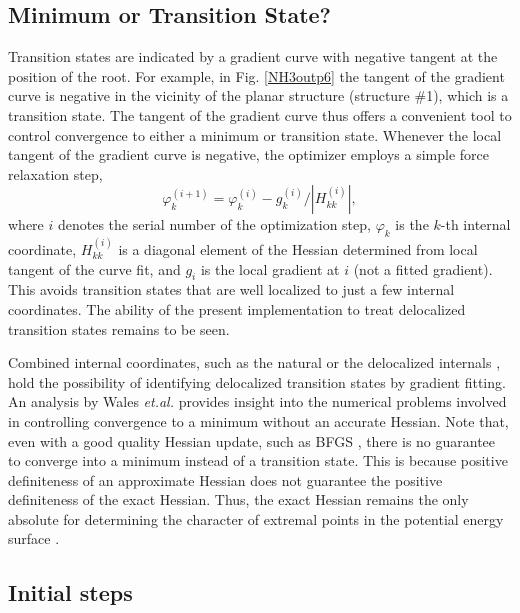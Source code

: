 \documentclass[prl,twocolumn,showpacs,twocolumngrid,superbib]{revtex4}
\begin{document}
\subsection{Minimum or Transition State?}

Transition states are indicated by a gradient curve with  negative tangent at the position
of the root.  For example, in Fig. \ref{NH3outp6} the tangent of the gradient curve is negative 
in the vicinity of the planar structure (structure \#1), which is a transition state. The tangent 
of the gradient curve thus offers a convenient tool to control convergence to either a minimum 
or transition state.  Whenever the local tangent of the gradient curve is negative, the optimizer 
employs a simple force relaxation step,
\begin{equation}
\label{tseq}
\varphi_{k}^{(i+1)} = \varphi_{k}^{(i)} -g_{k}^{(i)}/|H_{kk}^{(i)}| ,
\end{equation}
where $i$ denotes the serial number of the optimization step,  $\varphi_{k}$ is the $k$-th internal coordinate,
 $H^{(i)}_{kk}$ is a diagonal element of the Hessian determined from local tangent of the curve fit, and
$g_i$ is the local gradient at $i$ (not a fitted gradient).
This avoids transition states that are well localized to just a few internal coordinates.
The ability of the present implementation to treat delocalized transition states
remains to be seen. 

Combined internal coordinates, such as the natural \cite{Pulay_natural_internals} or the
delocalized internals \cite{Baker_deloc_1}, hold the possibility of identifying delocalized transition 
states by gradient fitting.  An analysis by  Wales {\it et.al.} \cite{Wales_saddlepoint} provides 
insight into the numerical problems involved in controlling convergence to a minimum without an 
accurate Hessian.  Note that, even with a good quality Hessian update, such as BFGS \cite{RFletcher},
there is no guarantee to converge into a minimum instead of a transition state. 
This is because positive definiteness of an approximate Hessian does not guarantee
the positive definiteness of the exact Hessian.  Thus, the exact Hessian remains the only 
absolute for determining the character of extremal points in the potential energy 
surface \cite{Pulay_natural_internals}.

\subsection{Initial steps}
\end{document}
